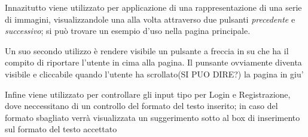 Innazitutto viene utilizzato per applicazione di una rappresentazione di una serie di immagini, visualizzandole
una alla volta attraverso due pulsanti \textit{precedente} e \textit{successivo}; si può trovare un esempio d'uso
nella pagina principale.

Un suo secondo utilizzo è rendere visibile un pulsante a freccia in su che ha il compito di riportare l'utente
in cima alla pagina. Il punsante ovviamente diventa visibile e cliccabile quando l'utente ha scrollato(SI PUO DIRE?) la pagina in giu'

Infine viene utilizzato per controllare gli input tipo per Login e Registrazione, dove neccessitano di un controllo del formato
del testo inserito; in caso del formato sbagliato verrà visualizzata un suggerimento sotto al box di inserimento sul formato del
testo accettato